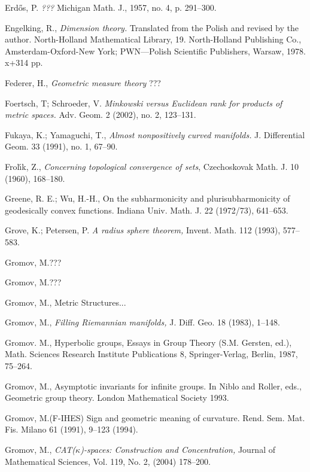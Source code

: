 \begin{thebibliography}{52}
 Erd\H{o}s, P. \textit{???} Michigan Math. J., 1957, no. 4,
p. 291--300.

 Engelking, R., \textit{Dimension theory.} Translated from the Polish and revised by the author. North-Holland Mathematical Library, 19. North-Holland Publishing Co., Amsterdam-Oxford-New York; PWN---Polish Scientific Publishers, Warsaw, 1978. x+314 pp.

Federer, H., \textit{Geometric measure theory} ???

Foertsch, T;  Schroeder, V. \textit{Minkowski versus Euclidean rank for products of metric spaces.}  Adv. Geom.  2  (2002),  no. 2, 123--131.

Fukaya, K.; Yamaguchi, T., \textit{Almost nonpositively curved manifolds.}  J. Differential Geom.  33  (1991),  no. 1, 67--90.

 Frol\'{\i}k, Z., \textit{Concerning topological convergence of sets}, Czechoskovak Math. J. 10 (1960), 168--180.

 Greene, R. E.; Wu, H.-H., On the subharmonicity and plurisubharmonicity of geodesically convex
functions.
Indiana Univ. Math. J. 22 (1972/73), 641--653.

  Grove, K.; Petersen, P. \textit{A radius sphere theorem,}
Invent. Math. 112 (1993), 577--583.

Gromov, M.???

 Gromov, M.???

 Gromov, M., Metric Structures...

  Gromov, M., \textit{Filling Riemannian manifolds,} J. Diff. Geo. 18 (1983), 1--148.


Gromov. M.,
Hyperbolic groups, 
Essays in Group Theory (S.M. Gersten, ed.),
Math. Sciences Research Institute Publications 8,
Springer-Verlag, Berlin,
1987, 75--264.

Gromov, M., Asymptotic invariants for infinite groups. 
In Niblo and Roller, eds.,
Geometric group theory. London Mathematical Society 1993.

Gromov, M.(F-IHES)
Sign and geometric meaning of curvature. 
Rend. Sem. Mat. Fis. Milano 61 (1991), 9--123 (1994). 

 Gromov, M., \textit{CAT($\kappa$)-spaces: Construction and Concentration,} Journal of Mathematical Sciences, Vol. 119, No. 2, (2004) 178--200.



\end{thebibliography}
